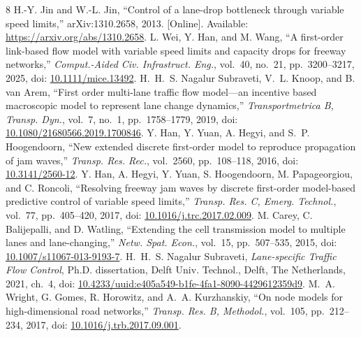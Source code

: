 \documentclass[10pt,a4paper]{article}
\newcommand{\Jin}[1]{\textcolor{SrcJin}{#1}}
\newcommand{\Wei}[1]{\textcolor{SrcWei}{#1}}
\newcommand{\NS}[1]{\textcolor{SrcNS}{#1}}
\newcommand{\Hsix}[1]{\textcolor{SrcHan16}{#1}}
\newcommand{\Hseven}[1]{\textcolor{SrcHan17}{#1}}
\newcommand{\Carey}[1]{\textcolor{SrcCarey}{#1}}
\newcommand{\Thesis}[1]{\textcolor{SrcThesis}{#1}}
\newcommand{\Wright}[1]{\textcolor{SrcWright}{#1}}
\newcommand{\head}[1]{\par\vspace{5pt}\noindent\textbf{#1}\par\nobreak\vspace{1pt}}
\begin{document}
\par\pdfsavepos
{}
\clearpage
\makeatletter
\renewcommand{\section}{\@ifstar{\head}{\head}}
\renewcommand{\@biblabel}[1]{\ifcase#1\or\Jin{[#1]}\or\Wei{[#1]}\or\NS{[#1]}\or\Hsix{[#1]}\or\Hseven{[#1]}\or\Carey{[#1]}\or\Thesis{[#1]}\or\Wright{[#1]}\else[#1]\fi}
\makeatother
\begin{thebibliography}{8}
\setlength{\itemsep}{4pt}\setlength{\parskip}{0pt}
 \Jin{H.-Y. Jin and W.-L. Jin, ``Control of a lane-drop bottleneck
through variable speed limits,'' arXiv:1310.2658, 2013. [Online]. Available:
\url{https://arxiv.org/abs/1310.2658}.}
 \Wei{L. Wei, Y. Han, and M. Wang, ``A first-order link-based flow
model with variable speed limits and capacity drops for freeway networks,''
\emph{Comput.-Aided Civ. Infrastruct. Eng.}, vol.~40, no.~21,
pp.~3200--3217, 2025, doi:
\href{https://doi.org/10.1111/mice.13492}{10.1111/mice.13492}.}
 \NS{H.~H.~S. Nagalur Subraveti, V.~L. Knoop, and B. van Arem,
``First order multi-lane traffic flow model---an incentive based macroscopic
model to represent lane change dynamics,'' \emph{Transportmetrica B, Transp.
Dyn.}, vol.~7, no.~1, pp.~1758--1779, 2019,
doi: \href{https://doi.org/10.1080/21680566.2019.1700846}{10.1080/21680566.2019.1700846}.}
 \Hsix{Y. Han, Y. Yuan, A. Hegyi, and S.~P. Hoogendoorn,
``New extended discrete first-order model to reproduce propagation of jam
waves,'' \emph{Transp. Res. Rec.}, vol.~2560, pp.~108--118, 2016, doi:
\href{https://doi.org/10.3141/2560-12}{10.3141/2560-12}.}
 \Hseven{Y. Han, A. Hegyi, Y. Yuan, S. Hoogendoorn,
M. Papageorgiou, and C. Roncoli, ``Resolving freeway jam waves by discrete
first-order model-based predictive control of variable speed limits,''
\emph{Transp. Res. C, Emerg. Technol.}, vol.~77, pp.~405--420, 2017, doi:
\href{https://doi.org/10.1016/j.trc.2017.02.009}{10.1016/j.trc.2017.02.009}.}
 \Carey{M. Carey, C. Balijepalli, and D. Watling, ``Extending the
cell transmission model to multiple lanes and lane-changing,''
\emph{Netw. Spat. Econ.}, vol.~15, pp.~507--535, 2015, doi:
\href{https://doi.org/10.1007/s11067-013-9193-7}{10.1007/s11067-013-9193-7}.}
 \Thesis{H.~H.~S. Nagalur Subraveti, \emph{Lane-specific Traffic
Flow Control}, Ph.D. dissertation, Delft Univ. Technol., Delft, The
Netherlands, 2021, ch.~4, doi:
\href{https://doi.org/10.4233/uuid:e405a549-b1fe-4fa1-8090-4429612359d9}{10.4233/uuid:e405a549-b1fe-4fa1-8090-4429612359d9}.}
 \Wright{M.~A. Wright, G. Gomes, R. Horowitz, and
A.~A. Kurzhanskiy, ``On node models for high-dimensional road networks,''
\emph{Transp. Res. B, Methodol.}, vol.~105, pp.~212--234, 2017, doi:
\href{https://doi.org/10.1016/j.trb.2017.09.001}{10.1016/j.trb.2017.09.001}.}
\end{thebibliography}
\end{document}
